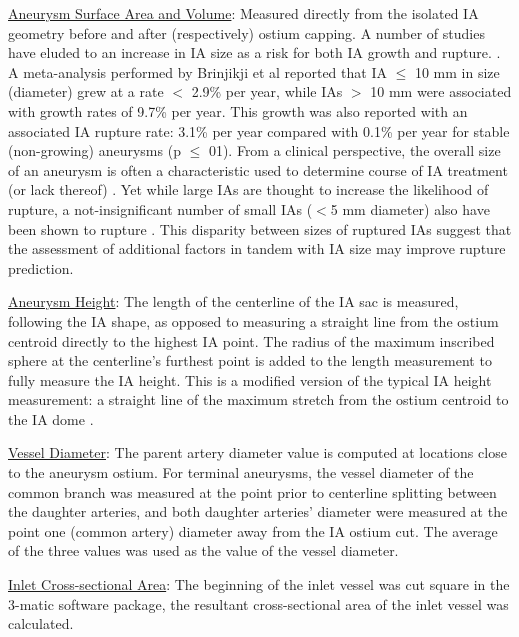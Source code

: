 \underline{Aneurysm Surface Area and Volume}: Measured directly from the isolated IA geometry before and after (respectively) ostium capping. A number of studies have eluded to an increase in IA size as a risk for both IA growth and rupture. \cite{varble2018stroke,brinjikji2015risk,Backes951,greving2014development}. A meta-analysis performed by Brinjikji et al reported that IA $\le$ 10 mm in size (diameter) grew at a rate $<$ 2.9\% per year, while IAs $>$ 10 mm were associated with growth rates of 9.7\% per year. This growth was also reported with an associated IA rupture rate: 3.1\% per year compared with 0.1\% per year for stable (non-growing) aneurysms (p $\le$ 01). From a clinical perspective, the overall size of an aneurysm is often a characteristic used to determine course of IA treatment (or lack thereof) \cite{williams2013management,komotar2008guidelines}. Yet while large IAs are thought to increase the likelihood of rupture, a not-insignificant number of small IAs ($<$5 mm diameter) also have been shown to rupture \cite{kashiwazaki2013size,forget2001review,Korja2014}. This disparity between sizes of ruptured IAs suggest that the assessment of additional factors in tandem with IA size may improve rupture prediction. 

\underline{Aneurysm Height}: The length of the centerline of the IA sac is measured, following the IA shape, as opposed to measuring a straight line from the ostium centroid directly to the highest IA point. The radius of the maximum inscribed sphere at the centerline's furthest point is added to the length measurement to fully measure the IA height. This is a modified version of the typical IA height measurement: a straight line of the maximum stretch from the ostium centroid to the IA dome \cite{ma2010size,duan2018morphological}. 

\underline{Vessel Diameter}: The parent artery diameter value is computed at locations close to the aneurysm ostium. For terminal aneurysms, the vessel diameter of the common branch was measured at the point prior to centerline splitting between the daughter arteries, and both daughter arteries' diameter were measured at the point one (common artery) diameter away from the IA ostium cut. The average of the three values was used as the value of the vessel diameter.

\underline{Inlet Cross-sectional Area}: The beginning of the inlet vessel was cut square in the 3-matic software package, the resultant cross-sectional area of the inlet vessel was calculated. 
 
